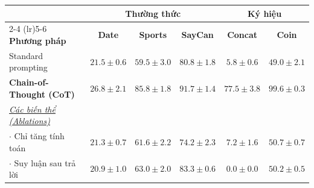 \begin{tabular}{l ccc cc}
    \toprule
    & \multicolumn{3}{c}{\textbf{Thường thức}} & \multicolumn{2}{c}{\textbf{Ký hiệu}} \\
    \cmidrule(lr){2-4} \cmidrule(lr){5-6}
    \textbf{Phương pháp} & \textbf{Date} & \textbf{Sports} & \textbf{SayCan} & \textbf{Concat} & \textbf{Coin} \\
    \midrule
    Standard prompting & $21.5 \pm 0.6$ & $59.5 \pm 3.0$ & $80.8 \pm 1.8$ & $5.8 \pm 0.6$ & $49.0 \pm 2.1$ \\ 
    \textbf{Chain-of-Thought (CoT)} & $\mathbf{26.8 \pm 2.1}$ & $\mathbf{85.8 \pm 1.8}$ & $\mathbf{91.7 \pm 1.4}$ & $\mathbf{77.5 \pm 3.8}$ & $\mathbf{99.6 \pm 0.3}$ \\
    \midrule
    \textit{\underline{Các biến thể (Ablations)}} & & & & & \\
    $\cdot$ Chỉ tăng tính toán & $21.3 \pm 0.7$ & $61.6 \pm 2.2$ & $74.2 \pm 2.3$ & $7.2 \pm 1.6$ & $50.7 \pm 0.7$ \\ 
    $\cdot$ Suy luận sau trả lời & $20.9 \pm 1.0$ & $63.0 \pm 2.0$ & $83.3 \pm 0.6$ & $0.0 \pm 0.0$ & $50.2 \pm 0.5$ \\
    
    \bottomrule
\end{tabular}
